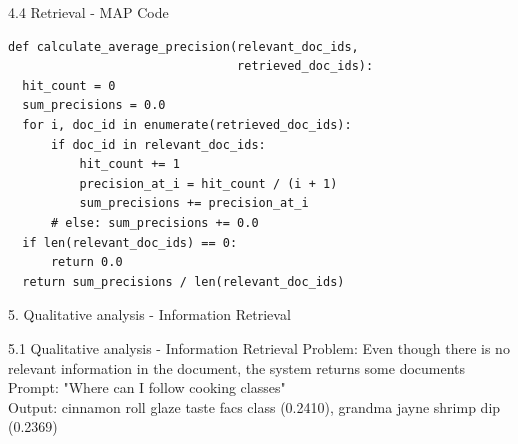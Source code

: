 \documentclass{beamer}
\begin{document}
\begin{frame}[fragile]{4.4 Retrieval - MAP Code}
  \begin{verbatim}
def calculate_average_precision(relevant_doc_ids,
                                retrieved_doc_ids):
  hit_count = 0
  sum_precisions = 0.0
  for i, doc_id in enumerate(retrieved_doc_ids):
      if doc_id in relevant_doc_ids:
          hit_count += 1
          precision_at_i = hit_count / (i + 1)
          sum_precisions += precision_at_i
      # else: sum_precisions += 0.0
  if len(relevant_doc_ids) == 0:
      return 0.0
  return sum_precisions / len(relevant_doc_ids)
  \end{verbatim}
\end{frame}

\begin{frame} {5. Qualitative analysis - Information Retrieval}
\end{frame}

\begin{frame} {5.1 Qualitative analysis - Information Retrieval}
  Problem: Even though there is no relevant information in the document, the system returns some documents\\
  Prompt: "Where can I follow cooking classes"\\
  Output: cinnamon roll glaze taste facs class (0.2410), grandma jayne shrimp dip (0.2369)
\end{frame}
\end{document}
